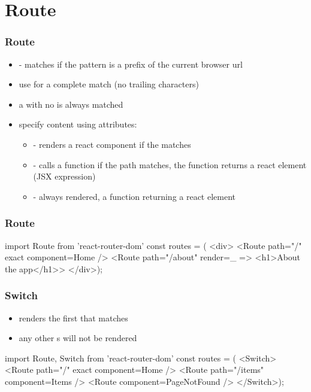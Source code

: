 \section{Route}
\begin{frame}[fragile] \frametitle{Route}
\begin{itemize}
  \item {} - matches if the pattern is a prefix of the current browser url
  \item use  for a complete match (no trailing characters)
  \item a  with no  is always matched
  \item specify content using attributes:
  \begin{itemize}
    \item {} - renders a react component if the  matches
    \item {} - calls a function if the path matches, the function returns a react element (JSX expression)
    \item {} - always rendered, a function returning a react element
  \end{itemize}
\end{itemize}
\end{frame}

\begin{frame}[fragile] \frametitle{Route}
\begin{CodeBox}{}
import { Route } from 'react-router-dom'
const routes = (
<div>
  <Route path="/" exact component={Home} />
  <Route path="/about"
           render={_ => <h1>About the app</h1>}>
</div>);
\end{CodeBox}
\end{frame}

\begin{frame}[fragile] \frametitle{Switch}
\begin{itemize}
  \item renders the first  that matches
  \item any other s will not be rendered
\end{itemize}

\vspace{5mm}
\begin{CodeBox}{}
import { Route, Switch } from 'react-router-dom'
const routes = (
<Switch>
  <Route path="/" exact component={Home} />
  <Route path="/items" component={Items} />
  <Route component={PageNotFound} />
</Switch>);
\end{CodeBox}
\end{frame}

